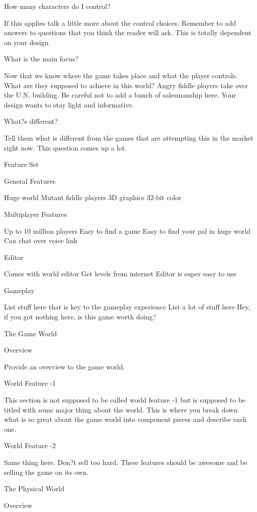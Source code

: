 \documentclass[a4paper]{article}
\begin{document}
How many characters do I control?

	If this applies talk a little more about the control choices.  Remember to add answers to questions that you think the reader will ask.  This is totally dependent on your design.




What is the main focus?

	Now that we know where the game takes place and what the player controls.  What are they supposed to achieve in this world?  Angry fiddle players take over the U.N. building.  Be careful not to add a bunch of salesmanship here.  Your design wants to stay light and informative.

What?s different?

Tell them what is different from the games that are attempting this in the market right now.  This question comes up a lot.

Feature Set

General Features

Huge world
Mutant fiddle players
3D graphics
32-bit color

Multiplayer Features

Up to 10 million players
Easy to find a game
Easy to find your pal in huge world
Can chat over voice link

Editor

Comes with world editor
Get levels from internet
Editor is super easy to use

Gameplay

List stuff here that is key to the gameplay experience
List a lot of stuff here
Hey, if you got nothing here, is this game worth doing?

The Game World

Overview

	Provide an overview to the game world.

World Feature -1

	This section is not supposed to be called world feature -1 but is supposed to be titled with some major thing about the world.  This is where you break down what is so great about the game world into component pieces and describe each one.

World Feature -2

	Same thing here.  Don?t sell too hard.  These features should be awesome and be selling the game on its own.

The Physical World

Overview
\end{document}
